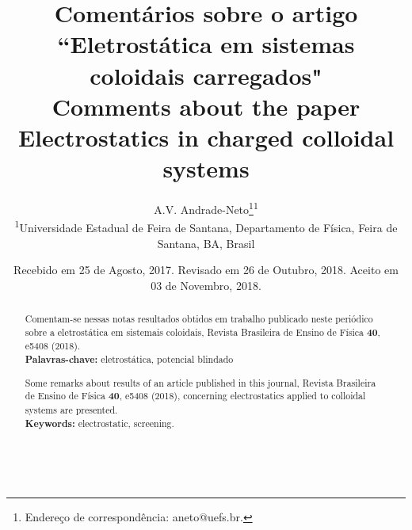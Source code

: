 \documentclass[brazilian,10.7pt,a4paper]{article}
\title{\textbf{Comentários sobre o artigo ``Eletrostática em sistemas coloidais carregados"}\\
\vspace{5pt}\small{\textbf{Comments about the paper Electrostatics in charged colloidal systems}}\vspace{-3pt}}
\author{A.V. Andrade-Neto\footnote{Endereço de correspondência: aneto@uefs.br.}\hspace{5pt}\textsuperscript{1}\vspace{7pt}\\ 
\small{\textsuperscript{1}Universidade Estadual de Feira de Santana, Departamento de Física, Feira de Santana, BA, Brasil}\vspace{6pt}}
\date{\small{Recebido em 25 de Agosto, 2017. Revisado em 26 de Outubro, 2018. Aceito em 03 de Novembro, 2018.}\vspace{-34pt}}
\begin{document}
\renewcommand{\abstractname}{}
\frenchspacing
\maketitle
\begin{abstract}
\small{
Comentam-se nessas notas resultados obtidos em trabalho publicado neste periódico sobre a eletrostática em
sistemais coloidais, Revista Brasileira de Ensino de Física \textbf{40}, e5408 (2018).\\
\textbf{Palavras-chave:} eletrostática, potencial blindado\\
\par
Some remarks about results of an article published in this journal, Revista Brasileira de Ensino de Física \textbf{40},
e5408 (2018), concerning electrostatics applied to colloidal systems are presented.\\
\textbf{Keywords:} electrostatic, screening.}\\
\end{abstract}
\end{document}
